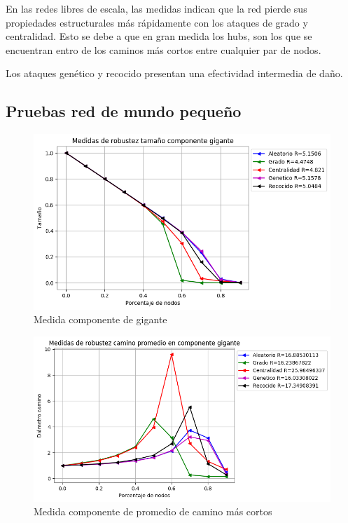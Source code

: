 En las redes libres de escala, las medidas indican que la red pierde sus propiedades estructurales más rápidamente con los ataques de grado y centralidad. Esto se debe a que en gran medida los hubs, son los que se encuentran entro de los caminos más cortos entre cualquier par de nodos.

Los ataques genético y recocido presentan una efectividad intermedia de daño.


\subsection{Pruebas red de mundo pequeño}

\begin{figure}[H]
    \centering
    \includegraphics[scale=0.7]{Capitulo5Robustez/imagenes/grafica_GC20180510_143549SmallWorld5000NodesRewire01.png}
    \caption{Medida componente de gigante}
\end{figure}


\begin{figure}[H]
    \centering
    \includegraphics[scale=0.7]{Capitulo5Robustez/imagenes/grafica_APL20180510_143549SmallWorld5000NodesRewire01.png}
    \caption{Medida componente de promedio de camino más cortos}
\end{figure}

